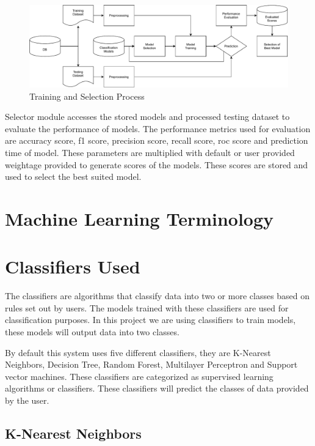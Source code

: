 \begin{figure}[H]
    \centering
    \includegraphics[width=0.9\columnwidth]{media/architecture/Process.pdf}
    \caption{Training and Selection Process}
    \label{fig:training_and_selection_process}
\end{figure}

Selector module accesses the stored models and processed testing dataset to evaluate the
performance of models. The performance metrics used for evaluation are accuracy score, f1
score, precision score, recall score, roc score and prediction time of model. These parameters
are multiplied with default or user provided weightage provided to generate scores of the
models. These scores are stored and used to select the best suited model.

\section{Machine Learning Terminology} \label{sec:machine_learning_terminology}


\section{Classifiers Used} \label{sec:supervised_learning}

The classifiers are algorithms that classify data into two or more classes based on rules set
out by users. The models trained with these classifiers are used for classification purposes.
In this project we are using classifiers to train models, these models will output data into
two classes.

By default this system uses five different classifiers, they are K-Nearest Neighbors, Decision
Tree, Random Forest, Multilayer Perceptron and Support vector machines. These classifiers are
categorized as supervised learning algorithms or classifiers. These classifiers will predict
the classes of data provided by the user.

\subsection{K-Nearest Neighbors} \label{subsec:K_nearest_neighbors}

